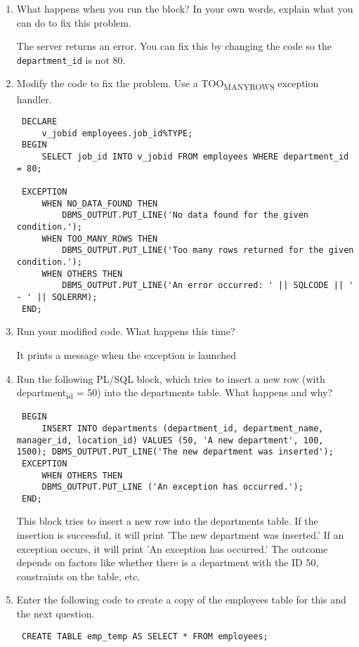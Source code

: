 \documentclass[11pt]{article}
\begin{document}
\begin{enumerate}
\item What happens when you run the block? In your own words, explain what you can do to fix this problem.

The server returns an error. You can fix this by changing the code so the \texttt{department\_id} is not 80.

\item Modify the code to fix the problem. Use a TOO\textsubscript{MANY}\textsubscript{ROWS} exception handler.
\begin{verbatim}
 DECLARE
     v_jobid employees.job_id%TYPE;
 BEGIN
     SELECT job_id INTO v_jobid FROM employees WHERE department_id = 80;

 EXCEPTION
     WHEN NO_DATA_FOUND THEN
         DBMS_OUTPUT.PUT_LINE('No data found for the given condition.');
     WHEN TOO_MANY_ROWS THEN
         DBMS_OUTPUT.PUT_LINE('Too many rows returned for the given condition.');
     WHEN OTHERS THEN
         DBMS_OUTPUT.PUT_LINE('An error occurred: ' || SQLCODE || ' - ' || SQLERRM);
 END;
\end{verbatim}

\item Run your modified code. What happens this time?

It prints a message when the exception is launched

\item Run the following PL/SQL block, which tries to insert a new row (with department\textsubscript{id} = 50) into the departments table. What happens and why?
\begin{verbatim}
 BEGIN
     INSERT INTO departments (department_id, department_name, manager_id, location_id) VALUES (50, 'A new department', 100, 1500); DBMS_OUTPUT.PUT_LINE('The new department was inserted');
 EXCEPTION
     WHEN OTHERS THEN
     DBMS_OUTPUT.PUT_LINE ('An exception has occurred.');
 END;
\end{verbatim}

This block tries to insert a new row into the departments table. If the insertion is successful, it will print 'The new department was inserted.' If an exception occurs, it will print 'An exception has occurred.' The outcome depends on factors like whether there is a department with the ID 50, constraints on the table, etc.

\item Enter the following code to create a copy of the employees table for this and the next question.
\begin{verbatim}
 CREATE TABLE emp_temp AS SELECT * FROM employees;
\end{verbatim}
\end{enumerate}
\end{document}
